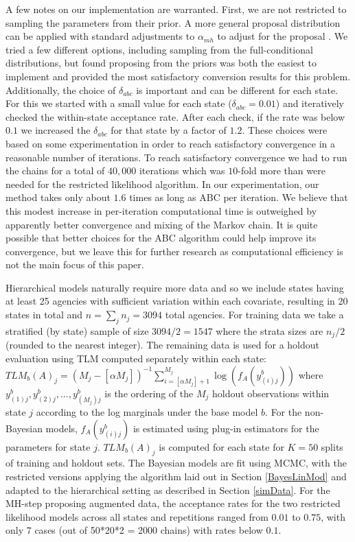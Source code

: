 \documentclass[ba]{imsart}
\begin{document}
A few notes on our implementation are warranted. First, we are not restricted to sampling the parameters from their prior. A more general proposal distribution can be applied with standard adjustments to $\alpha_{mh}$ to adjust for the proposal \citep{turner2014}. We tried a few different options, including sampling from the full-conditional distributions, but found proposing from the priors was both the easiest to implement and provided the most satisfactory conversion results for this problem. Additionally, the choice of $\delta_{abc}$ is important and can be different for each state. For this we started with a small value for each state ($\delta_{abc} = 0.01$) and iteratively checked the within-state acceptance rate. After each check, if the rate was below $0.1$ we increased the $\delta_{abc}$ for that state by a factor of $1.2$. These choices were based on some experimentation in order to reach satisfactory convergence in a reasonable number of iterations. To reach satisfactory convergence we had to run the chains for a total of $40,000$ iterations which was $10$-fold more than were needed for the restricted likelihood algorithm. In our experimentation, our method takes only about $1.6$ times as long as ABC per iteration.  We believe that this modest increase in per-iteration computational time is outweighed by apparently better convergence and mixing of the Markov chain.  It is quite possible that better choices for the ABC algorithm could help improve its convergence, but we leave this for further research as computational efficiency is not the main focus of this paper.

Hierarchical models naturally require more data and so we include states having at least 25 agencies with sufficient variation within each covariate, resulting in 20 states in total and $n = \sum_{j} n_{j} =  3094$ total agencies. For training data we take a stratified (by state) sample of size $3094/2 = 1547$ where the strata sizes are $n_{j}/2$ (rounded to the nearest integer). The remaining data is used for a holdout evaluation using TLM computed separately within each state: $TLM_b(A)_{j} = (M_{j} - [\alpha M_{j}])^{-1} \sum_{i=[\alpha M_{j}]+1}^{M_{j}} \log(f_A(y_{(i)j}^b))$ where $y_{(1)j}^b, y_{(2)j}^b,..., y_{(M_{j})j}^b$ is the ordering of the $M_{j}$ holdout observations within state $j$ according to the log marginals under the base model $b$. For the non-Bayesian models,  $f_A(y^b_{(i)j})$ is estimated using plug-in estimators for the parameters for state $j$. $TLM_b(A)_{j}$ is computed for each state for $K=50$ splits of training and holdout sets. The Bayesian models are fit using MCMC, with the restricted versions applying the algorithm laid out in Section \ref{BayesLinMod} and adapted to the hierarchical setting as described in Section \ref{simData}. For the MH-step proposing augmented data, the acceptance rates for the two restricted likelihood models across all states and repetitions ranged from $0.01$ to  $0.75$, with only $7$ cases (out of 50*20*2 = 2000 chains) with rates below $0.1$.
\end{document}
